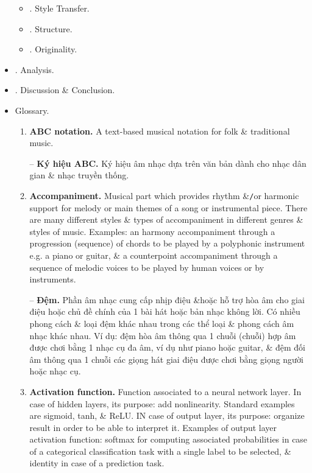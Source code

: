 \documentclass{article}
\begin{document}
\begin{itemize}
\begin{itemize}
\begin{itemize}
		\end{itemize}
		\item {. Style Transfer.}
		\item {. Structure.}
		\item {. Originality.}
	\end{itemize}
	\item {. Analysis.}
	\item {. Discussion \& Conclusion.}
	\item {\sf Glossary.}
	\begin{enumerate}
		\item {\bf ABC notation.} A text-based musical notation for folk \& traditional music.

		-- {\bf Ký hiệu ABC.} Ký hiệu âm nhạc dựa trên văn bản dành cho nhạc dân gian \& nhạc truyền thống.
		\item {\bf Accompaniment.} Musical part which provides rhythm \&{\tt/}or harmonic support for melody or main themes of a song or instrumental piece. There are many different styles \& types of accompaniment in different genres \& styles of music. Examples: an harmony accompaniment through a progression (sequence) of chords to be played by a polyphonic instrument e.g. a piano or guitar, \& a counterpoint accompaniment through a sequence of melodic voices to be played by human voices or by instruments.

		-- {\bf Đệm.} Phần âm nhạc cung cấp nhịp điệu \&{\tt}hoặc hỗ trợ hòa âm cho giai điệu hoặc chủ đề chính của 1 bài hát hoặc bản nhạc không lời. Có nhiều phong cách \& loại đệm khác nhau trong các thể loại \& phong cách âm nhạc khác nhau. Ví dụ: đệm hòa âm thông qua 1 chuỗi (chuỗi) hợp âm được chơi bằng 1 nhạc cụ đa âm, ví dụ như piano hoặc guitar, \& đệm đối âm thông qua 1 chuỗi các giọng hát giai điệu được chơi bằng giọng người hoặc nhạc cụ.
		\item {\bf Activation function.} Function associated to a neural network layer. In case of hidden layers, its purpose: add nonlinearity. Standard examples are sigmoid, tanh, \& ReLU. IN case of output layer, its purpose: organize result in order to be able to interpret it. Examples of output layer activation function: softmax for computing associated probabilities in case of a categorical classification task with a single label to be selected, \& identity in case of a prediction task.


\end{enumerate}
\end{itemize}
\end{document}
